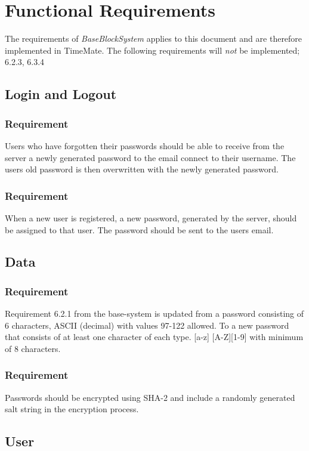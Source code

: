 \documentclass{article}
\begin{document}
\section{Functional Requirements}
\item The requirements of \emph{BaseBlockSystem} applies to this document and are therefore implemented in TimeMate. The following requirements will \emph{not} be implemented; 6.2.3, 6.3.4

\subsection{Login and Logout}


\subsubsection{Requirement}
Users who have forgotten their passwords should be able to receive from the server a newly generated password to the email connect to their username. The users old password is then overwritten with the newly generated password.

\subsubsection{Requirement}
When a new user is registered, a new password, generated by the server, should be assigned to that user. The password should be sent to the users email.

\subsection{Data}
\subsubsection{Requirement}
Requirement 6.2.1 from the base-system is updated from a password consisting of 6 characters, ASCII (decimal) with values 97-122 allowed. To a new password that consists of at least one character of each type. [a-z] [A-Z][1-9] with minimum of 8 characters.
\subsubsection{Requirement}
Passwords should be encrypted using SHA-2 and include a randomly generated salt string in the encryption process.


\subsection{User}
\end{document}
